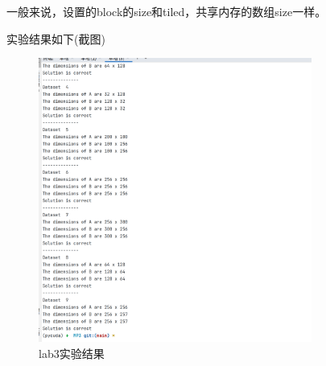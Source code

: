 \documentclass[11pt]{ctexart}
\begin{document}
一般来说，设置的block的size和tiled，共享内存的数组size一样。

\newpage

实验结果如下(截图)
\begin{figure}[ht]
	\centering
	\includegraphics[width=0.8\textwidth]{images/Lab3.png}
	\caption{lab3实验结果}
	\label{fig:1}
\end{figure}
\end{document}
